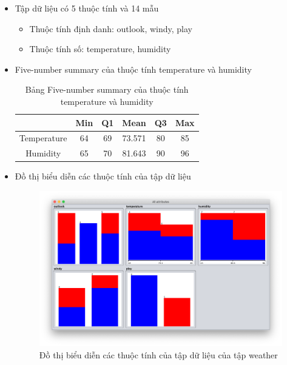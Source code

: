 \documentclass[a4paper, 12pt]{article}
\begin{document}
\begin{itemize}
    \item Tập dữ liệu có 5 thuộc tính và 14 mẫu
    \begin{itemize}
        \item Thuộc tính định danh: outlook, windy, play
        \item Thuộc tính số: temperature, humidity
    \end{itemize}

    \item Five-number summary của thuộc tính temperature và humidity
    \begin{table}[H]
        \begin{center}
            \begin{tabular}{|c|c|c|c|c|c|}
            \hline
                        & Min & Q1 & Mean   & Q3 & Max \\ \hline
            Temperature & 64  & 69 & 73.571 & 80 & 85  \\ \hline
            Humidity    & 65  & 70 & 81.643 & 90 & 96  \\ \hline
            \end{tabular}
            \caption{Bảng Five-number summary của thuộc tính temperature và humidity }
        \end{center}
    \end{table}

    \item Đồ thị biểu diễn các thuộc tính của tập dữ liệu
    \begin{figure}[H]
        \begin{center}
            \includegraphics[scale = 0.45]{images/weather_diagram.png}
            \caption{Đồ thị biểu diễn các thuộc tính của tập dữ liệu của tập weather}
        \end{center}
    \end{figure}


\end{itemize}
\end{document}
